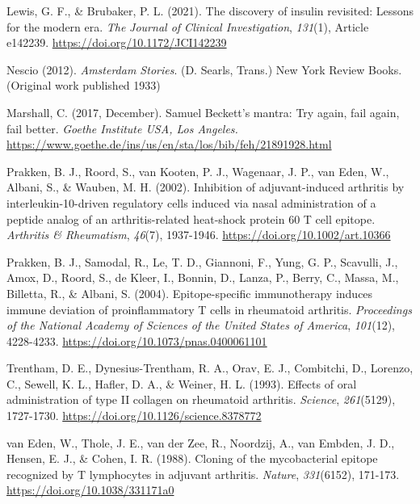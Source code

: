 \documentclass[authordate, editorial]{jote-new-article}
\begin{document}
	Lewis, G. F., \& Brubaker, P. L. (2021). The discovery of insulin revisited: Lessons for the modern era. \emph{The} \emph{Journal of Clinical Investigation},\emph{ 131}(1), Article e142239. \url{https://doi.org/10.1172/JCI142239}



	Nescio (2012). \emph{Amsterdam Stories}. (D. Searls, Trans.) New York Review Books. (Original work published 1933)



	Marshall, C. (2017, December). Samuel Beckett's mantra: Try again, fail again, fail better. \emph{Goethe Institute USA, Los Angeles.} \url{https://www.goethe.de/ins/us/en/sta/los/bib/feh/21891928.html}



	Prakken, B. J., Roord, S., van Kooten, P. J., Wagenaar, J. P., van Eden, W., Albani, S., \& Wauben, M. H. (2002). Inhibition of adjuvant-induced arthritis by interleukin-10-driven regulatory cells induced via nasal administration of a peptide analog of an arthritis-related heat-shock protein 60 T cell epitope. \emph{Arthritis \& Rheumatism},\emph{ 46}(7), 1937-1946. \url{https://doi.org/10.1002/art.10366}



	Prakken, B. J., Samodal, R., Le, T. D., Giannoni, F., Yung, G. P., Scavulli, J., Amox, D., Roord, S., de Kleer, I., Bonnin, D., Lanza, P., Berry, C., Massa, M., Billetta, R., \& Albani, S. (2004). Epitope-specific immunotherapy induces immune deviation of proinflammatory T cells in rheumatoid arthritis. \emph{Proceedings of the National Academy of Sciences of the United States of America},\emph{ 101}(12), 4228-4233. \url{https://doi.org/10.1073/pnas.0400061101}



	Trentham, D. E., Dynesius-Trentham, R. A., Orav, E. J., Combitchi, D., Lorenzo, C., Sewell, K. L., Hafler, D. A., \& Weiner, H. L. (1993). Effects of oral administration of type II collagen on rheumatoid arthritis. \emph{Science},\emph{ 261}(5129), 1727-1730. \url{https://doi.org/10.1126/science.8378772}



	van Eden, W., Thole, J. E., van der Zee, R., Noordzij, A., van Embden, J. D., Hensen, E. J., \& Cohen, I. R. (1988). Cloning of the mycobacterial epitope recognized by T lymphocytes in adjuvant arthritis. \emph{Nature},\emph{ 331}(6152), 171-173. \url{https://doi.org/10.1038/331171a0}
\end{document}
